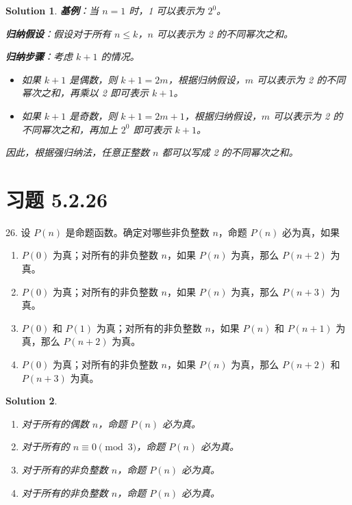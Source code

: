 \documentclass[UTF8]{report}
\newtheorem{solution}{Solution}
\theoremstyle{MyLineTheoremStyle} %
\theoremstyle{MyBlockTheoremStyle} %
\theoremstyle{MySubsubsectionStyle} %
\begin{document}
\begin{solution}
    \textbf{基例}：当 \( n = 1 \) 时，1 可以表示为 \( 2^0 \)。
    
    \textbf{归纳假设}：假设对于所有 \( n \leq k \)，\( n \) 可以表示为 2 的不同幂次之和。
    
    \textbf{归纳步骤}：考虑 \( k+1 \) 的情况。
    \begin{itemize}
        \item 如果 \( k+1 \) 是偶数，则 \( k+1 = 2m \)，根据归纳假设，\( m \) 可以表示为 2 的不同幂次之和，再乘以 2 即可表示 \( k+1 \)。
        \item 如果 \( k+1 \) 是奇数，则 \( k+1 = 2m + 1 \)，根据归纳假设，\( m \) 可以表示为 2 的不同幂次之和，再加上 \( 2^0 \) 即可表示 \( k+1 \)。
    \end{itemize}
    
    因此，根据强归纳法，任意正整数 \( n \) 都可以写成 2 的不同幂次之和。
\end{solution}

\section{习题 5.2.26}
26. 设 $P(n)$ 是命题函数。确定对哪些非负整数 $n$，命题 $P(n)$ 必为真，如果
\begin{enumerate}
    \item $P(0)$ 为真；对所有的非负整数 $n$，如果 $P(n)$ 为真，那么 $P(n+2)$ 为真。
    \item $P(0)$ 为真；对所有的非负整数 $n$，如果 $P(n)$ 为真，那么 $P(n+3)$ 为真。
    \item $P(0)$ 和 $P(1)$ 为真；对所有的非负整数 $n$，如果 $P(n)$ 和 $P(n+1)$ 为真，那么 $P(n+2)$ 为真。
    \item $P(0)$ 为真；对所有的非负整数 $n$，如果 $P(n)$ 为真，那么 $P(n+2)$ 和 $P(n+3)$ 为真。
\end{enumerate}

\begin{solution}
    \begin{enumerate}
        \item 对于所有的偶数 \( n \)，命题 \( P(n) \) 必为真。
        \item 对于所有的 \( n \equiv 0 \pmod{3} \)，命题 \( P(n) \) 必为真。
        \item 对于所有的非负整数 \( n \)，命题 \( P(n) \) 必为真。
        \item 对于所有的非负整数 \( n \)，命题 \( P(n) \) 必为真。
    \end{enumerate}
\end{solution}
\end{document}
